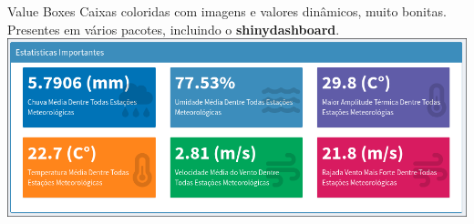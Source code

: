 \documentclass[aspectratio=1610]{beamer}
\begin{document}
\begin{frame}{Value Boxes}
    Caixas coloridas com imagens e valores dinâmicos, muito bonitas.
    Presentes em vários pacotes, incluindo o \textbf{shinydashboard}.
    \includegraphics[width=\textwidth]{value_boxes.png}
\end{frame}
\end{document}
